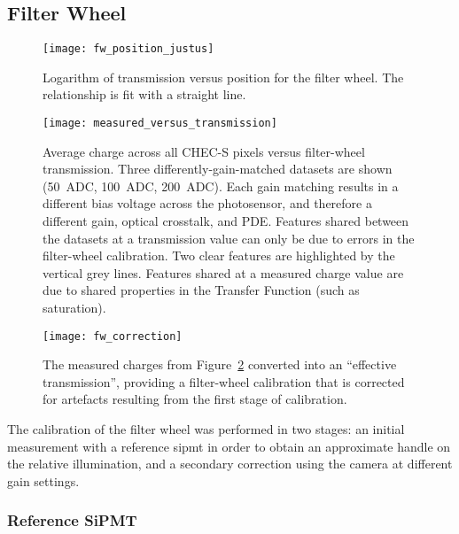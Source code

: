 \subsection{Filter Wheel}

\begin{figure}
	\centering
    \texttt{[image: fw\_position\_justus]} 
	\caption[Filter-wheel Position Calibration]{Logarithm of transmission versus position for the filter wheel. The relationship is fit with a straight line.}
	\label{fig:fw_position}
\end{figure}

\begin{figure}
	\centering
    \texttt{[image: measured\_versus\_transmission]} 
	\caption[Measured charge versus transmission]{Average charge across all CHEC-S pixels versus filter-wheel transmission. Three differently-gain-matched datasets are shown (50~ADC, 100~ADC, 200~ADC). Each gain matching results in a different bias voltage across the photosensor, and therefore a different gain, optical crosstalk, and PDE. Features shared between the datasets at a transmission value can only be due to errors in the filter-wheel calibration. Two clear features are highlighted by the vertical grey lines. Features shared at a measured charge value are due to shared properties in the Transfer Function (such as saturation).}
	\label{fig:measured_versus_transmission}
\end{figure}

\begin{figure}
	\centering
    \texttt{[image: fw\_correction]} 
	\caption[Secondary filter-wheel calibration]{The measured charges from Figure~\ref{fig:measured_versus_transmission} converted into an ``effective transmission'', providing a filter-wheel calibration that is corrected for artefacts resulting from the first stage of calibration.}
	\label{fig:fw_correction}
\end{figure}

The calibration of the filter wheel was performed in two stages: an initial measurement with a reference \gls{sipmt} in order to obtain an approximate handle on the relative illumination, and a secondary correction using the camera at different gain settings.

\subsubsection{Reference SiPMT}

